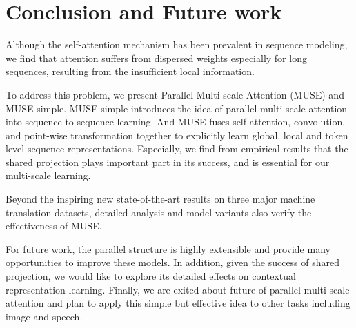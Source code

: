 \documentclass{article} %
\begin{document}



\section{Conclusion and Future work}

Although the self-attention mechanism has been prevalent in sequence modeling, we find that attention suffers from dispersed weights especially for long sequences, resulting from the insufficient local information. 

To address this problem, we present Parallel Multi-scale Attention (MUSE) and MUSE-simple.  MUSE-simple introduces the idea of parallel multi-scale attention into sequence to sequence learning. And MUSE fuses self-attention, convolution, and point-wise transformation together to explicitly learn global, local and token level sequence representations. 
Especially, we find from empirical results that the shared projection plays important part in its success, and is essential for our multi-scale learning.

Beyond the inspiring new state-of-the-art results on three major machine translation datasets, detailed  analysis and model variants also verify the effectiveness of MUSE. 

For future work, the parallel structure is highly extensible and provide many opportunities to improve these models. In addition, given the success of shared projection, we would like to explore its detailed effects on contextual representation learning. Finally, we are exited about future of parallel multi-scale attention and plan to apply this simple but effective idea to other tasks including image and speech.
\end{document}
